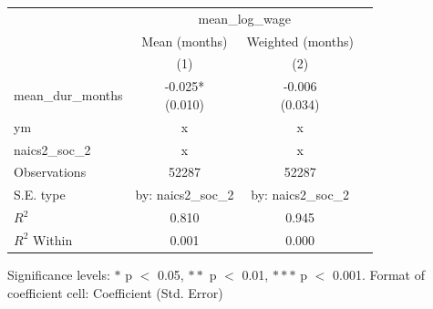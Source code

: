 \renewcommand\cellalign{t}
\begin{threeparttable}
\begin{tabular}{lccc}
\toprule
 & \multicolumn{2}{c}{mean_log_wage} \\
\cmidrule(lr){2-3} 
 & Mean (months) & Weighted (months) \\
 & (1) & (2) \\
\midrule
\addlinespace
mean_dur_months & \makecell{-0.025* \\ (0.010)} & \makecell{-0.006 \\ (0.034)} \\
\midrule
\addlinespace
ym & x & x \\
naics2_soc_2 & x & x \\
\midrule
\addlinespace
Observations & 52287 & 52287 \\
S.E. type & by: naics2_soc_2 & by: naics2_soc_2 \\
$R^2$ & 0.810 & 0.945 \\
$R^2$ Within & 0.001 & 0.000 \\
\bottomrule
\end{tabular}
\footnotesize Significance levels: $*$ p $<$ 0.05, $**$ p $<$ 0.01, $***$ p $<$ 0.001. Format of coefficient cell: Coefficient 
 (Std. Error)
\end{threeparttable}